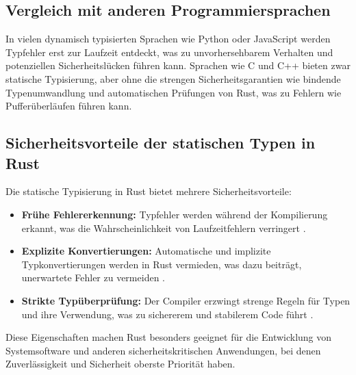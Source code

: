 \subsection{Vergleich mit anderen Programmiersprachen}

In vielen dynamisch typisierten Sprachen wie Python oder JavaScript werden Typfehler erst zur Laufzeit entdeckt, was zu unvorhersehbarem Verhalten und potenziellen Sicherheitslücken führen kann. 
Sprachen wie C und C++ bieten zwar statische Typisierung, aber ohne die strengen Sicherheitsgarantien wie bindende Typenumwandlung und automatischen Prüfungen von Rust, was zu Fehlern wie Pufferüberläufen führen kann.

\subsection{Sicherheitsvorteile der statischen Typen in Rust}

Die statische Typisierung in Rust bietet mehrere Sicherheitsvorteile:
\begin{itemize}
    \item \textbf{Frühe Fehlererkennung:} Typfehler werden während der Kompilierung erkannt, was die Wahrscheinlichkeit von Laufzeitfehlern verringert \cite{shuklin2020}.
    \item \textbf{Explizite Konvertierungen:} Automatische und implizite Typkonvertierungen werden in Rust vermieden, was dazu beiträgt, unerwartete Fehler zu vermeiden \cite[Kapitel 1. Types]{drysdale2024}.
    \item \textbf{Strikte Typüberprüfung:} Der Compiler erzwingt strenge Regeln für Typen und ihre Verwendung, was zu sichererem und stabilerem Code führt \cite{shuklin2020}.
\end{itemize}
\noindent
Diese Eigenschaften machen Rust besonders geeignet für die Entwicklung von Systemsoftware und anderen sicherheitskritischen Anwendungen, bei denen Zuverlässigkeit und Sicherheit oberste Priorität haben.
